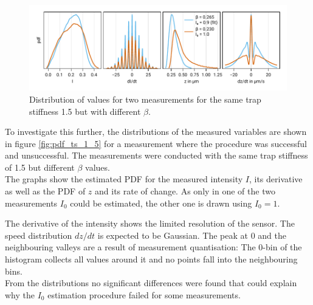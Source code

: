 \documentclass[
    twoside=false,
    twocolumn=true,
    fontsize=11pt,
]{scrarticle}
\begin{document}
\begin{figure}
    \centering
    \includegraphics{figures/02_04_02_hist.pdf}
    \caption{Distribution of values for two measurements for the same trap stiffness \SI{1.5}{} but with different $\beta$.}
    \label{fig:pdf_ts_1_5}
\end{figure}
To investigate this further, the distributions of the measured variables are shown in figure \autoref{fig:pdf_ts_1_5} for a measurement where the procedure was successful and unsuccessful. 
The measurements were conducted with the same trap stiffness of \SI{1.5}{} but different $\beta$ values.\\
The graphs show the estimated PDF for the measured intensity $I$, its derivative as well as the PDF of $z$ and its rate of change. 
As only in one of the two measurements $I_0$ could be estimated, the other one is drawn using $I_0=1$.

The derivative of the intensity shows the limited resolution of the sensor.
The speed distribution $dz/dt$ is expected to be Gaussian.
The peak at $0$ and the neighbouring valleys are a result of measurement quantisation: The $0$-bin of the histogram collects all values around it and no points fall into the neighbouring bins.\\
From the distributions no significant differences were found that could explain why the $I_0$ estimation procedure failed for some measurements.
\end{document}
